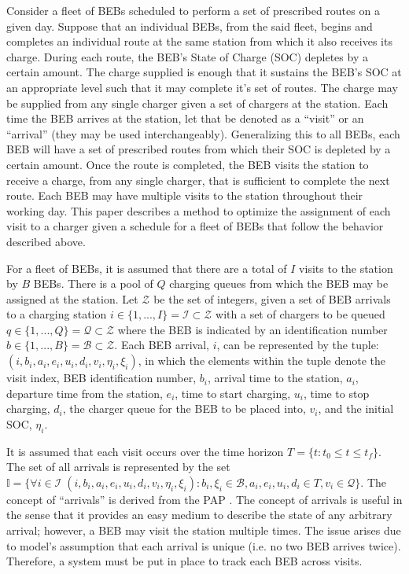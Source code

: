 \documentclass[11pt,a4paper,final]{article}
\newcommand{\visit}{(i, b_i, a_i, e_i, u_i, d_i, v_i, \eta_i, \xi_i)}
\newcommand{\I}{\mathbb{I}}                 %
\newcommand{\Iset}{\mathcal{I}}             %
\newcommand{\Bset}{\mathcal{B}}             %
\newcommand{\Qset}{\mathcal{Q}}             %
\begin{document}
Consider a fleet of BEBs scheduled to perform a set of prescribed routes on a given day. Suppose that an individual
BEBs, from the said fleet, begins and completes an individual route at the same station from which it also receives its
charge. During each route, the BEB's State of Charge (SOC) depletes by a certain amount. The charge supplied is enough
that it sustains the BEB's SOC at an appropriate level such that it may complete it's set of routes. The charge may be
supplied from any single charger given a set of chargers at the station. Each time the BEB arrives at the station, let
that be denoted as a ``visit'' or an ``arrival'' (they may be used interchangeably). Generalizing this to all BEBs, each BEB
will have a set of prescribed routes from which their SOC is depleted by a certain amount. Once the route is completed,
the BEB visits the station to receive a charge, from any single charger, that is sufficient to complete the next route.
Each BEB may have multiple visits to the station throughout their working day. This paper describes a method to optimize
the assignment of each visit to a charger given a schedule for a fleet of BEBs that follow the behavior described above.

For a fleet of BEBs, it is assumed that there are a total of \(I\) visits to the station by \(B\) BEBs. There is a pool of
\(Q\) charging queues from which the BEB may be assigned at the station. Let \(\mathcal{Z}\) be the set of integers, given a set of
BEB arrivals to a charging station \(i \in \{1,..., I\} = \Iset \subset \mathcal{Z}\) with a set of chargers to be queued \(q \in \{1,..., Q\}
= \Qset \subset \mathcal{Z}\) where the BEB is indicated by an identification number \(b \in \{1,..., B\} = \Bset \subset \mathcal{Z}\). Each BEB arrival,
\(i\), can be represented by the tuple: \(\visit\), in which the elements within the tuple denote the visit index, BEB
identification number, \(b_i\), arrival time to the station, \(a_i\), departure time from the station, \(e_i\), time to start
charging, \(u_i\), time to stop charging, \(d_i\), the charger queue for the BEB to be placed into, \(v_i\), and the initial
SOC, \(\eta_i\).

It is assumed that each visit occurs over the time horizon \(T = \{t : t_0 \le t \le t_f \}\). The set of all arrivals is
represented by the set \(\I = \{\forall i \in \Iset \; \visit: b_i, \xi_i \in \Bset, a_i, e_i, u_i, d_i \in T, v_i \in \Qset \}\). The
concept of ``arrivals'' is derived from the PAP \cite{qarebagh-2019-optim-sched}. The concept of arrivals is useful in
the sense that it provides an easy medium to describe the state of any arbitrary arrival; however, a BEB may visit the
station multiple times. The issue arises due to model's assumption that each arrival is unique (i.e. no two BEB arrives
twice). Therefore, a system must be put in place to track each BEB across visits.
\end{document}
